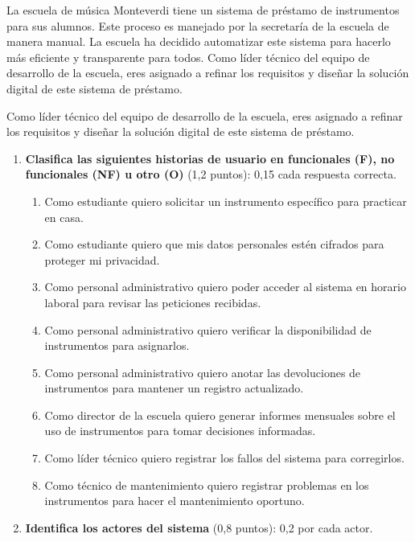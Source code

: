 

La escuela de música Monteverdi tiene un sistema de préstamo de instrumentos para sus alumnos.
Este proceso es manejado por la secretaría de la escuela de manera manual.
La escuela ha decidido automatizar este sistema para hacerlo más eficiente y transparente para todos.
Como líder técnico del equipo de desarrollo de la escuela, eres asignado a refinar los requisitos y diseñar la solución digital de este sistema de préstamo.

\begin{enunciado}
    Como líder técnico del equipo de desarrollo de la escuela, eres asignado a refinar los requisitos y diseñar la solución digital de este sistema de préstamo.
    \begin{enumerate}
        \item \textbf{Clasifica las siguientes historias de usuario en funcionales (F), no funcionales (NF) u otro (O)} (1,2 puntos): 0,15 cada respuesta correcta.
        \begin{enumerate}
            \item Como estudiante quiero solicitar un instrumento específico para practicar en casa.
            \item Como estudiante quiero que mis datos personales estén cifrados para proteger mi privacidad.
            \item Como personal administrativo quiero poder acceder al sistema en horario laboral para revisar las peticiones recibidas.
            \item Como personal administrativo quiero verificar la disponibilidad de instrumentos para asignarlos.
            \item Como personal administrativo quiero anotar las devoluciones de instrumentos para mantener un registro actualizado.
            \item Como director de la escuela quiero generar informes mensuales sobre el uso de instrumentos para tomar decisiones informadas.
            \item Como líder técnico quiero registrar los fallos del sistema para corregirlos.
            \item Como técnico de mantenimiento quiero registrar problemas en los instrumentos para hacer el mantenimiento oportuno.
        \end{enumerate}
        \item \textbf{Identifica los actores del sistema} (0,8 puntos): 0,2 por cada actor.
    \end{enumerate}
\end{enunciado}

